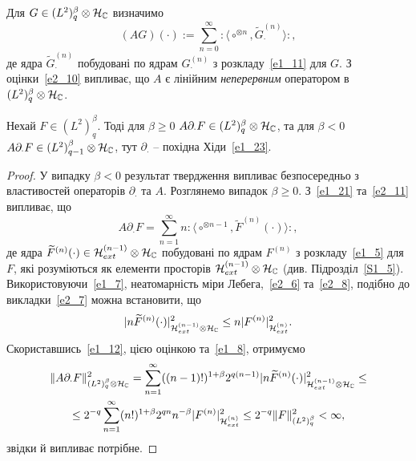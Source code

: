 Для $G\in (L^2)^\beta_q\otimes\mathcal{H}_{\mathbb{C}}$ визначимо
\begin{equation}\label{e2_11}
(AG)(\cdot):=\sum_{n=0}^\infty
{:\!\langle}\circ^{\otimes n},\widetilde G^{(n)}_\cdot{\rangle\!:},
\end{equation}
де ядра $\widetilde G^{(n)}_\cdot$ побудовані по ядрам $G^{(n)}_\cdot$ з розкладу~\eqref{e1_11}
для $G$. З оцінки~\eqref{e2_10} випливає, що  $A$ є лінійним {\it неперервним} оператором
в $(L^2)^\beta_q\otimes\mathcal{H}_{\mathbb{C}}$.
\begin{subproposition}\label{p2_3_1}
Нехай $F\in (L^2)^\beta_q$. Тоді для $\beta\geq 0$
$A\partial_\cdot F\in (L^2)^\beta_q\otimes\mathcal{H}_{\mathbb{C}}$, та для
$\beta<0$ $A\partial_\cdot F\in (L^2)^\beta_{q-1}\otimes\mathcal{H}_{\mathbb{C}}$,
тут $\partial_\cdot$ -- похідна Хіди~\eqref{e1_23}.
\end{subproposition}
\begin{proof}
У випадку $\beta<0$ результат твердження випливає безпосередньо з властивостей операторів
$\partial_\cdot$ та $A$. Розглянемо випадок $\beta\geq 0$. З~\eqref{e1_21} та~\eqref{e2_11}
випливає, що
\begin{equation*}
A\partial_\cdot F=\sum_{n=1}^\infty n{:\!\langle}\circ^{\otimes n-1},
\widetilde F^{(n)}(\cdot){\rangle\!:},
\end{equation*}
де ядра $\widetilde F^{(n)}(\cdot)\in\mathcal{H}_{ext}^{(n-1)}\otimes\mathcal{H}_{\mathbb{C}}$
побудовані по ядрам $F^{(n)}$ з розкладу~\eqref{e1_5} для $F$, які розуміються як елементи
просторів $\mathcal{H}_{ext}^{(n-1)}\otimes\mathcal{H}_{\mathbb{C}}$ (див. Підрозділ~\ref{S1_5}).
Використовуючи~\eqref{e1_7}, неатомарність міри Лебега,~\eqref{e2_6} та~\eqref{e2_8}, подібно
до викладки~\eqref{e2_7} можна встановити, що
\begin{equation}\label{e2_19}
|n\widetilde F^{(n)}(\cdot)|_{\mathcal{H}_{ext}^{(n-1)}\otimes\mathcal{H}_{\mathbb{C}}}^2
\leq n|F^{(n)}|_{\mathcal{H}_{ext}^{(n)}}^2.
\end{equation}
Скориставшись~\eqref{e1_12}, цією оцінкою та~\eqref{e1_8}, отримуємо
\begin{gather*}
\|A\partial_\cdot F\|_{(L^2)^\beta_q\otimes\mathcal{H}_{\mathbb{C}}}^2
=\sum_{n=1}^\infty ((n-1)!)^{1+\beta}2^{q(n-1)}
|n\widetilde F^{(n)}(\cdot)
|_{\mathcal{H}_{ext}^{(n-1)}\otimes\mathcal{H}_{\mathbb{C}}}^2\leq\\
\leq 2^{-q}\sum_{n=1}^\infty (n!)^{1+\beta}2^{qn}n^{-\beta}
|F^{(n)}|_{\mathcal{H}_{ext}^{(n)}}^2
\leq 2^{-q}\|F\|_{(L^2)^\beta_q}^2<\infty,
\end{gather*}
звідки й випливає потрібне.
\end{proof}

